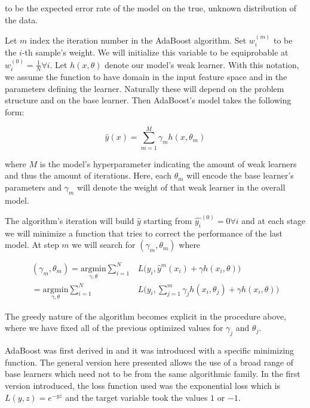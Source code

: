 to be the expected error rate of the model on the true,  unknown distribution of the data.

Let $m$ index the iteration number in the AdaBoost algorithm. Set $w^{(m)}_i$ to be the $i$-th sample's weight. We will initialize this variable to be equiprobable at $w^{(0)}_i = \frac{1}{N} \forall i$. Let $h(x,\theta)$  denote our model's weak learner. With this notation, we assume the function to have domain in the input feature space and in the parameters defining the learner. Naturally these will depend on the problem structure and on the base learner. Then AdaBoost's model takes the following form:

\begin{equation} \label{equation-adaBoostModel}
\hat{y}(x) = \sum_{m=1}^{M} \gamma_m h(x,\theta_m)
\end{equation}

where $M$ is the model's hyperparameter indicating the amount of weak learners and thus the amount of iterations. Here, each $\theta_m$ will encode the base learner's parameters and $\gamma_m$ will denote the weight of that weak learner in the overall model.

The algorithm's iteration will build $\hat{y}$ starting from $\hat{y_i}^{(0)}= 0 \forall i$ and at each stage we will minimize a function that tries to correct the performance of the last model. At step $m$ we will search for $(\gamma_{m}, \theta_{m})$ where

\begin{equation} \label{equation-adaBoostIteration}
\begin{split}
(\gamma_{m}, \theta_{m}) = \underset{\gamma, \theta}{\mathrm{argmin}}  \sum_{i=1}^{N} & L\big( y_i,   \hat{y}^{m}(x_i) + \gamma h(x_i,\theta) \big) \\
= \underset{\gamma, \theta}{\mathrm{argmin}} \sum_{i=1}^{N}  & L\big( y_i,    \sum_{j=1}^{m} \gamma_j h(x_i,\theta_j) + \gamma h(x_i,\theta) \big)
\end{split}
\end{equation}

The greedy nature of the algorithm becomes explicit in the procedure above, where we have fixed all of the previous optimized values for $\gamma_j$ and $\theta_j$.

AdaBoost was first derived in \textcite{schapire-adaBoost} and it was introduced with a specific  minimizing function. The general version here presented allows the use of a broad range of base learners which need not to be from the same algorithmic family. In the first version introduced, the loss function used was the exponential loss which is $L(y,z) = e^{-yz}$ and the target variable took the values $1$ or $-1$.

